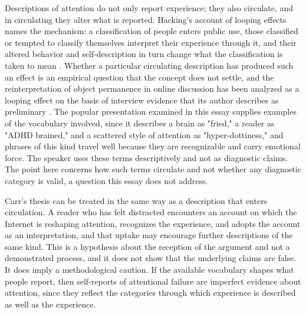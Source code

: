 \documentclass[12pt]{article}
\begin{document}
Descriptions of attention do not only report experience; they also circulate, and in circulating they alter what is reported. Hacking's account of looping effects names the mechanism: a classification of people enters public use, those classified or tempted to classify themselves interpret their experience through it, and their altered behavior and self-description in turn change what the classification is taken to mean \cite{hacking1995looping}. Whether a particular circulating description has produced such an effect is an empirical question that the concept does not settle, and the reinterpretation of object permanence in online discussion has been analyzed as a looping effect on the basis of interview evidence that its author describes as preliminary \cite{chevalier2024}. The popular presentation examined in this essay supplies examples of the vocabulary involved, since it describes a brain as "fried," a reader as "ADHD brained," and a scattered style of attention as "hyper-dottiness," and phrases of this kind travel well because they are recognizable and carry emotional force. The speaker uses these terms descriptively and not as diagnostic claims. The point here concerns how such terms circulate and not whether any diagnostic category is valid, a question this essay does not address.

Carr's thesis can be treated in the same way as a description that enters circulation. A reader who has felt distracted encounters an account on which the Internet is reshaping attention, recognizes the experience, and adopts the account as an interpretation, and that uptake may encourage further descriptions of the same kind. This is a hypothesis about the reception of the argument and not a demonstrated process, and it does not show that the underlying claims are false. It does imply a methodological caution. If the available vocabulary shapes what people report, then self-reports of attentional failure are imperfect evidence about attention, since they reflect the categories through which experience is described as well as the experience.
\end{document}
